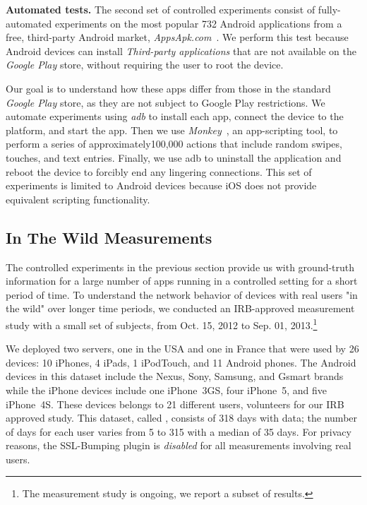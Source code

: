 \noindent\textbf{Automated tests.} The second set of controlled experiments consist of fully-automated
experiments on the most popular 732 Android applications from a free,
third-party Android market, \emph{AppsApk.com}~\cite{appsapk}.
We perform this test because Android devices can install
\emph{Third-party applications} that are not available on the
\emph{Google Play} store, without requiring the user to root the device. 

Our goal is to understand how these apps differ from those in the standard \emph{Google Play} 
store, as they are not subject to Google Play restrictions.
We automate experiments using \emph{adb} to
install each app, connect the device to the \meddle platform, and
start the app. Then we use \emph{Monkey}~\cite{adbmonkey}, an app-scripting 
tool, to perform a series of  approximately100,000 actions that include
random swipes, touches, and text entries.  Finally, we use adb to
uninstall the application and reboot the device to forcibly end any
lingering connections. This set of experiments is limited to
Android devices because iOS does not provide equivalent 
scripting functionality. 

\subsection{In The Wild Measurements}
\label{sec:dataset-wild-measurements}

The controlled experiments in the previous section provide us with 
ground-truth information for a large number of apps running in a controlled 
setting for a short period of time. To understand the network behavior of 
devices with real users "in the wild" over longer time periods, we conducted 
an IRB-approved measurement study with a small set of subjects, from 
Oct. 15, 2012 to Sep. 01, 2013.\footnote{The measurement study is ongoing, we report a subset of results.}

We deployed two \platname servers, one in the USA and one in France
that were used by 26 devices: 10 iPhones, 4 iPads, 1 iPodTouch, and 11
Android phones.  The Android devices in this dataset include the
Nexus, Sony, Samsung, and Gsmart brands while the iPhone devices
include one iPhone~3GS, four iPhone~5, and five iPhone~4S.  These
devices belongs to 21 different users, volunteers for our IRB approved
study.  This dataset, called \mobWild, consists of 318 days with data; the number of 
days for each user varies from 5 to 315 with a median of 35 days.  For privacy reasons, the
SSL-Bumping plugin is \emph{disabled} for all measurements involving
real users.


